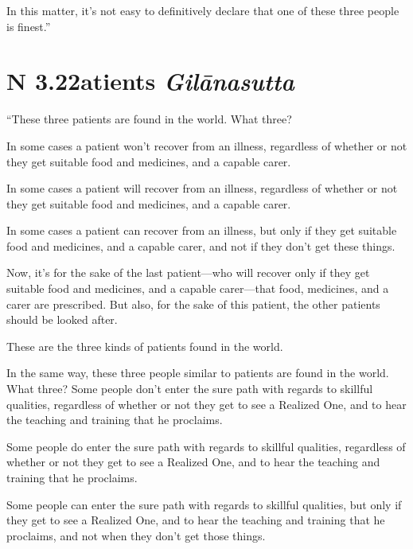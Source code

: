 \documentclass[12pt,openany]{book}%
\newcommand*{\suttatitleacronym}[1]{\smaller[2]{#1}\vspace*{.3em}}
\newcommand*{\suttatitletranslation}[1]{\linebreak{#1}}
\newcommand*{\suttatitleroot}[1]{\linebreak\smaller[2]\itshape{#1}}
\newcommand*{\tocacronym}[1]{\hspace*{-3.3em}{#1}\quad}
\newcommand*{\toctranslation}[1]{#1}
\newcommand*{\tocroot}[1]{(\textit{#1})}
\begin{document}
In this matter, it’s not easy to definitively declare that one of these three people is finest.” 

%
\section*{{\suttatitleacronym AN 3.22}{\suttatitletranslation Patients }{\suttatitleroot Gilānasutta}}
\addcontentsline{toc}{section}{\tocacronym{AN 3.22} \toctranslation{Patients } \tocroot{Gilānasutta}}

“These three patients are found in the world. What three? 

In some cases a patient won’t recover from an illness, regardless of whether or not they get suitable food and medicines, and a capable carer. 

In some cases a patient will recover from an illness, regardless of whether or not they get suitable food and medicines, and a capable carer. 

In some cases a patient can recover from an illness, but only if they get suitable food and medicines, and a capable carer, and not if they don’t get these things. 

Now, it’s for the sake of the last patient—who will recover only if they get suitable food and medicines, and a capable carer—that food, medicines, and a carer are prescribed. But also, for the sake of this patient, the other patients should be looked after. 

These are the three kinds of patients found in the world. 

In the same way, these three people similar to patients are found in the world. What three? Some people don’t enter the sure path with regards to skillful qualities, regardless of whether or not they get to see a Realized One, and to hear the teaching and training that he proclaims. 

Some people do enter the sure path with regards to skillful qualities, regardless of whether or not they get to see a Realized One, and to hear the teaching and training that he proclaims. 

Some people can enter the sure path with regards to skillful qualities, but only if they get to see a Realized One, and to hear the teaching and training that he proclaims, and not when they don’t get those things. 
\end{document}

